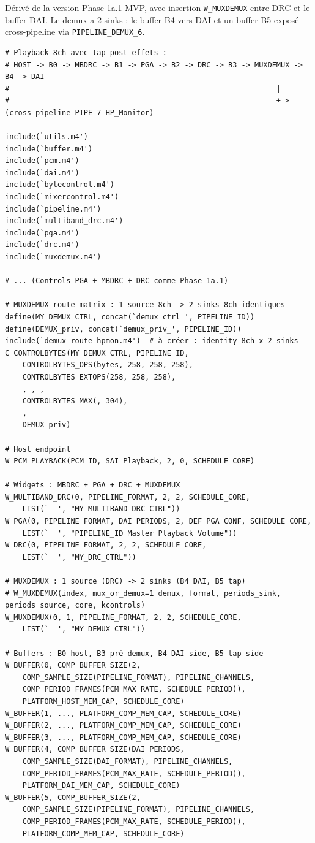 \documentclass[11pt,a4paper]{article}
\begin{document}
Dérivé de la version Phase 1a.1 MVP, avec insertion \texttt{W\_MUXDEMUX} entre DRC et le buffer DAI. Le demux a 2 sinks : le buffer B4 vers DAI et un buffer B5 exposé cross-pipeline via \texttt{PIPELINE\_DEMUX\_6}.

\begin{lstlisting}[language={}, basicstyle=\ttfamily\scriptsize]
# Playback 8ch avec tap post-effets :
# HOST -> B0 -> MBDRC -> B1 -> PGA -> B2 -> DRC -> B3 -> MUXDEMUX -> B4 -> DAI
#                                                             |
#                                                             +-> (cross-pipeline PIPE 7 HP_Monitor)

include(`utils.m4')
include(`buffer.m4')
include(`pcm.m4')
include(`dai.m4')
include(`bytecontrol.m4')
include(`mixercontrol.m4')
include(`pipeline.m4')
include(`multiband_drc.m4')
include(`pga.m4')
include(`drc.m4')
include(`muxdemux.m4')

# ... (Controls PGA + MBDRC + DRC comme Phase 1a.1)

# MUXDEMUX route matrix : 1 source 8ch -> 2 sinks 8ch identiques
define(MY_DEMUX_CTRL, concat(`demux_ctrl_', PIPELINE_ID))
define(DEMUX_priv, concat(`demux_priv_', PIPELINE_ID))
include(`demux_route_hpmon.m4')  # à créer : identity 8ch x 2 sinks
C_CONTROLBYTES(MY_DEMUX_CTRL, PIPELINE_ID,
	CONTROLBYTES_OPS(bytes, 258, 258, 258),
	CONTROLBYTES_EXTOPS(258, 258, 258),
	, , ,
	CONTROLBYTES_MAX(, 304),
	,
	DEMUX_priv)

# Host endpoint
W_PCM_PLAYBACK(PCM_ID, SAI Playback, 2, 0, SCHEDULE_CORE)

# Widgets : MBDRC + PGA + DRC + MUXDEMUX
W_MULTIBAND_DRC(0, PIPELINE_FORMAT, 2, 2, SCHEDULE_CORE,
	LIST(`	', "MY_MULTIBAND_DRC_CTRL"))
W_PGA(0, PIPELINE_FORMAT, DAI_PERIODS, 2, DEF_PGA_CONF, SCHEDULE_CORE,
	LIST(`	', "PIPELINE_ID Master Playback Volume"))
W_DRC(0, PIPELINE_FORMAT, 2, 2, SCHEDULE_CORE,
	LIST(`	', "MY_DRC_CTRL"))

# MUXDEMUX : 1 source (DRC) -> 2 sinks (B4 DAI, B5 tap)
# W_MUXDEMUX(index, mux_or_demux=1 demux, format, periods_sink, periods_source, core, kcontrols)
W_MUXDEMUX(0, 1, PIPELINE_FORMAT, 2, 2, SCHEDULE_CORE,
	LIST(`	', "MY_DEMUX_CTRL"))

# Buffers : B0 host, B3 pré-demux, B4 DAI side, B5 tap side
W_BUFFER(0, COMP_BUFFER_SIZE(2,
	COMP_SAMPLE_SIZE(PIPELINE_FORMAT), PIPELINE_CHANNELS,
	COMP_PERIOD_FRAMES(PCM_MAX_RATE, SCHEDULE_PERIOD)),
	PLATFORM_HOST_MEM_CAP, SCHEDULE_CORE)
W_BUFFER(1, ..., PLATFORM_COMP_MEM_CAP, SCHEDULE_CORE)
W_BUFFER(2, ..., PLATFORM_COMP_MEM_CAP, SCHEDULE_CORE)
W_BUFFER(3, ..., PLATFORM_COMP_MEM_CAP, SCHEDULE_CORE)
W_BUFFER(4, COMP_BUFFER_SIZE(DAI_PERIODS,
	COMP_SAMPLE_SIZE(DAI_FORMAT), PIPELINE_CHANNELS,
	COMP_PERIOD_FRAMES(PCM_MAX_RATE, SCHEDULE_PERIOD)),
	PLATFORM_DAI_MEM_CAP, SCHEDULE_CORE)
W_BUFFER(5, COMP_BUFFER_SIZE(2,
	COMP_SAMPLE_SIZE(PIPELINE_FORMAT), PIPELINE_CHANNELS,
	COMP_PERIOD_FRAMES(PCM_MAX_RATE, SCHEDULE_PERIOD)),
	PLATFORM_COMP_MEM_CAP, SCHEDULE_CORE)


\end{lstlisting}
\end{document}
